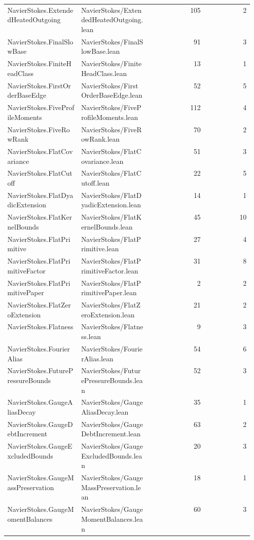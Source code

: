 \begin{longtable}{p{0.30\linewidth}p{0.28\linewidth}rr}
NavierStokes.ExtendedHeatedOutgoing & NavierStokes/ExtendedHeatedOutgoing.lean & 105 & 2\\
NavierStokes.FinalSlowBase & NavierStokes/FinalSlowBase.lean & 91 & 3\\
NavierStokes.FiniteHeadClass & NavierStokes/FiniteHeadClass.lean & 13 & 1\\
NavierStokes.FirstOrderBaseEdge & NavierStokes/FirstOrderBaseEdge.lean & 52 & 5\\
NavierStokes.FiveProfileMoments & NavierStokes/FiveProfileMoments.lean & 112 & 4\\
NavierStokes.FiveRowRank & NavierStokes/FiveRowRank.lean & 70 & 2\\
NavierStokes.FlatCovariance & NavierStokes/FlatCovariance.lean & 51 & 3\\
NavierStokes.FlatCutoff & NavierStokes/FlatCutoff.lean & 22 & 5\\
NavierStokes.FlatDyadicExtension & NavierStokes/FlatDyadicExtension.lean & 14 & 1\\
NavierStokes.FlatKernelBounds & NavierStokes/FlatKernelBounds.lean & 45 & 10\\
NavierStokes.FlatPrimitive & NavierStokes/FlatPrimitive.lean & 27 & 4\\
NavierStokes.FlatPrimitiveFactor & NavierStokes/FlatPrimitiveFactor.lean & 31 & 8\\
NavierStokes.FlatPrimitivePaper & NavierStokes/FlatPrimitivePaper.lean & 2 & 2\\
NavierStokes.FlatZeroExtension & NavierStokes/FlatZeroExtension.lean & 21 & 2\\
NavierStokes.Flatness & NavierStokes/Flatness.lean & 9 & 3\\
NavierStokes.FourierAlias & NavierStokes/FourierAlias.lean & 54 & 6\\
NavierStokes.FuturePressureBounds & NavierStokes/FuturePressureBounds.lean & 52 & 3\\
NavierStokes.GaugeAliasDecay & NavierStokes/GaugeAliasDecay.lean & 35 & 1\\
NavierStokes.GaugeDebtIncrement & NavierStokes/GaugeDebtIncrement.lean & 63 & 2\\
NavierStokes.GaugeExcludedBounds & NavierStokes/GaugeExcludedBounds.lean & 20 & 3\\
NavierStokes.GaugeMassPreservation & NavierStokes/GaugeMassPreservation.lean & 18 & 1\\
NavierStokes.GaugeMomentBalances & NavierStokes/GaugeMomentBalances.lean & 60 & 3\\

\end{longtable}
